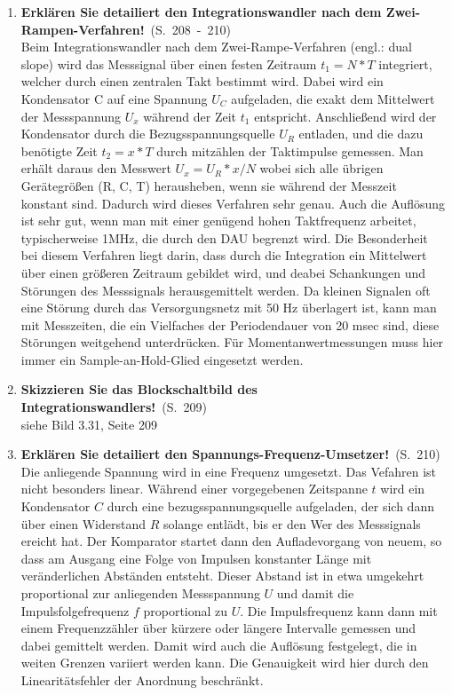 \documentclass[a4paper,12pt]{article}
\newcommand{\statement}[3]{\pagebreak[3]\item {\textbf{#1!}}\ (S.\ #2)#3}
\newcommand{\normaltext}[1]{\\#1}
\newcommand{\page}[1]{#1}
\newcommand{\pages}[2]{#1\ -\ #2}
\begin{document}
\begin{enumerate}
  \statement{Erklären Sie detailiert den Integrationswandler nach dem Zwei-Rampen-Verfahren}{\pages{208}{210}}
  {
    \normaltext{Beim Integrationswandler nach dem Zwei-Rampe-Verfahren (engl.: dual slope) wird
                das Messsignal über einen festen Zeitraum $t_1 = N*T$ integriert, welcher durch
                einen zentralen Takt bestimmt wird. Dabei wird ein Kondensator C auf eine Spannung
                $U_C$ aufgeladen, die exakt dem Mittelwert der Messspannung $U_x$ während der Zeit $t_1$
                entspricht. Anschließend wird der Kondensator durch die Bezugsspannungsquelle $U_R$
                entladen, und die dazu benötigte Zeit $t_2 = x*T$ durch mitzählen der Taktimpulse gemessen.
                Man erhält daraus den Messwert $U_x = U_R * x/N$ wobei sich alle übrigen Gerätegrößen
                (R, C, T) herausheben, wenn sie während der Messzeit konstant sind. Dadurch wird dieses
                Verfahren sehr genau. Auch die Auflösung ist sehr gut, wenn man mit einer genügend hohen
                Taktfrequenz arbeitet, typischerweise 1MHz, die durch den DAU begrenzt wird. Die Besonderheit
                bei diesem Verfahren liegt darin, dass durch die Integration ein Mittelwert über einen größeren
                Zeitraum gebildet wird, und deabei Schankungen und Störungen des Messsignals herausgemittelt
                werden. Da kleinen Signalen oft eine Störung durch das Versorgungsnetz mit 50 Hz überlagert ist,
                kann man mit Messzeiten, die ein Vielfaches der Periodendauer von 20 msec sind, diese Störungen
                weitgehend unterdrücken. Für Momentanwertmessungen muss hier immer ein Sample-an-Hold-Glied
                eingesetzt werden.}
  }

  \statement{Skizzieren Sie das Blockschaltbild des Integrationswandlers}{\page{209}}
  {
    \normaltext{siehe Bild 3.31, Seite 209}
  }

  \statement{Erklären Sie detailiert den Spannungs-Frequenz-Umsetzer}{\page{210}}
  {
    \normaltext{Die anliegende Spannung wird in eine Frequenz umgesetzt. Das Vefahren ist
                nicht besonders linear. Während einer vorgegebenen Zeitspanne $t$ wird
                ein Kondensator $C$ durch eine bezugsspannungsquelle aufgeladen, der sich
                dann über einen Widerstand $R$ solange entlädt, bis er den Wer des Messsignals
                ereicht hat. Der Komparator startet dann den Aufladevorgang von neuem, so dass
                am Ausgang eine Folge von Impulsen konstanter Länge mit veränderlichen Abständen
                entsteht. Dieser Abstand ist in etwa umgekehrt proportional zur anliegenden
                Messspannung $U$ und damit die Impulsfolgefrequenz $f$ proportional zu $U$.
                Die Impulsfrequenz kann dann mit einem Frequenzzähler über kürzere oder
                längere Intervalle gemessen und dabei gemittelt werden. Damit wird auch die
                Auflösung festgelegt, die in weiten Grenzen variiert werden kann. Die Genauigkeit
                wird hier durch den Linearitätsfehler der Anordnung beschränkt.}
  }


\end{enumerate}
\end{document}
